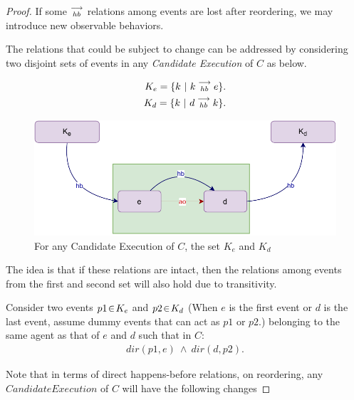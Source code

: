 \begin{proof}
        If some $\stackrel{\longrightarrow}{_{hb}}$ relations among events are lost after reordering, we may introduce new observable behaviors. 
        
        The relations that could be subject to change can be addressed by considering two disjoint sets of events in any \textit{Candidate Execution} of $C$ as below.
        
        \begin{align*}
            K_e = \{k \ | \ k\stackrel{\longrightarrow}{_{hb}}e \}. \\
            K_d = \{k \ | \ d\stackrel{\longrightarrow}{_{hb}}k \}. 
        \end{align*}
            
        \begin{figure}[H]
            \centering
            \includegraphics[scale=0.7]{Q1(a).pdf}
            \caption{For any Candidate Execution of $C$, the set $K_e$ and $K_d$}
            \label{fig:my_label}
        \end{figure}
        
        The idea is that if these relations are intact, then the relations among events from the first and second set will also hold due to transitivity.
        
        Consider two events $p1\!\in\!K_e$ and $p2\!\in\!K_d$ (When $e$ is the first event or $d$ is the last event, assume dummy events that can act as $p1$ or $p2$.) belonging to the same agent as that of $e$ and $d$ such that in $C$:
        \begin{align*}
            dir(p1,e)\ \wedge\ dir(d,p2).
        \end{align*}

        Note that in terms of direct happens-before relations, on reordering, any $Candidate Execution$ of $C$ will have the following changes
        

\end{proof}
